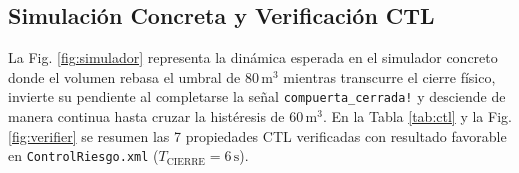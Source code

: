 \documentclass[conference]{IEEEtran}
\begin{document}
\begin{table}[htbp]
\caption{Barrido de Sensibilidad WCRT en \texttt{verifyta.exe} (UPPAAL 5.0)}
\begin{center}
\label{tab:wcrt}
\end{center}
\end{table}

\subsection{Simulación Concreta y Verificación CTL}
La Fig. \ref{fig:simulador} representa la dinámica esperada en el simulador concreto donde el volumen rebasa el umbral de $80\,\text{m}^3$ mientras transcurre el cierre físico, invierte su pendiente al completarse la señal \texttt{compuerta\_cerrada!} y desciende de manera continua hasta cruzar la histéresis de $60\,\text{m}^3$. En la Tabla \ref{tab:ctl} y la Fig. \ref{fig:verifier} se resumen las 7 propiedades CTL verificadas con resultado favorable en \texttt{ControlRiesgo.xml} ($T_{\text{CIERRE}} = 6\,\text{s}$).
\end{document}

